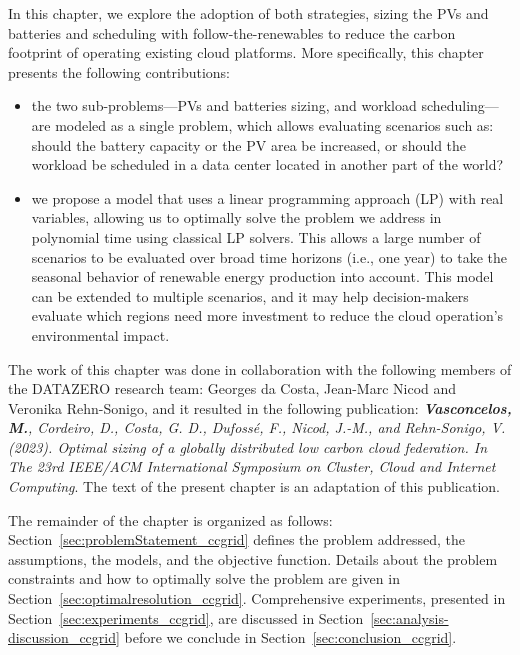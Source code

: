 In this chapter, we explore the adoption of both strategies, sizing the PVs and batteries and scheduling with follow-the-renewables to reduce the carbon footprint of operating existing cloud platforms. More specifically, this chapter presents the following contributions: 

\begin{itemize}
    
    \item the two sub-problems---PVs and batteries sizing, and workload scheduling--- are modeled as a single problem, which allows evaluating scenarios such as: should the battery capacity or the PV area be increased, or should the workload be scheduled in a data center located in another part of the world?
    
    \item we propose a model that uses a linear programming approach (LP) with real variables, allowing us to optimally solve the problem we address in polynomial time using classical LP solvers. This allows a large number of scenarios to be evaluated over broad time horizons (i.e., one year) to take the seasonal behavior of renewable energy production into account. This model can be extended to multiple scenarios, and it may help decision-makers evaluate which regions need more investment to reduce the cloud operation's environmental impact.

\end{itemize}



The work of this chapter was done in collaboration with the following members of the DATAZERO\cite{datazero} research team: Georges da Costa, Jean-Marc Nicod and Veronika Rehn-Sonigo, and it resulted in the following publication:  \textit{\textbf{Vasconcelos, M.}, Cordeiro, D., Costa, G. D., Dufossé, F., Nicod, J.-M., and Rehn-Sonigo, V. (2023). Optimal sizing of a globally distributed low carbon cloud federation. In The 23rd IEEE/ACM International Symposium on Cluster, Cloud and Internet Computing}. The text of the present chapter is an adaptation of this publication.


The remainder of the chapter is organized as follows: Section~\ref{sec:problemStatement_ccgrid} defines the problem addressed, the assumptions, the models, and the objective function. Details about the problem constraints and how to optimally solve the problem are given in Section~\ref{sec:optimalresolution_ccgrid}. Comprehensive experiments, presented in Section~\ref{sec:experiments_ccgrid}, are discussed in Section~\ref{sec:analysis-discussion_ccgrid} before we conclude in Section~\ref{sec:conclusion_ccgrid}. 






